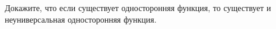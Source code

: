 Докажите, что если существует односторонняя функция, то существует и неуниверсальная односторонняя
функция.
